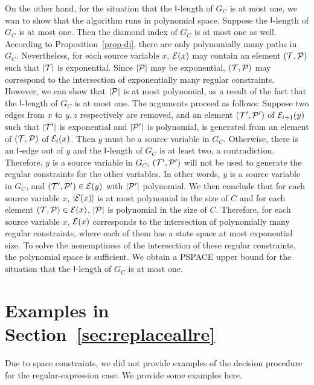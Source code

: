 On the other hand, for the situation that the $\mathsf{l}$-length of $G_C$ is at most one, we wan to show that the algorithm runs in polynomial space. Suppose the $\mathsf{l}$-length of $G_C$ is at most one. Then the diamond index of $G_C$ is at most one as well. According to Proposition~\ref{prop-di}, there are only polynomially many paths in $G_C$. Nevertheless, for each source variable $x$, $\mathcal{E}(x)$ may contain an element $(\mathcal{T},\mathcal{P})$ such that $|\mathcal{T}|$ is exponential. Since $|\mathcal{P}|$ may be exponential, $(\mathcal{T},\mathcal{P})$ may correspond to the intersection of exponentially many regular constraints. However, we can show that $|\mathcal{P}|$ is at most polynomial, as a result of the fact that the $\mathsf{l}$-length of $G_C$ is at most one. The arguments proceed as follows: Suppose two edges from $x$ to $y, z$ respectively are removed, and an element $(\mathcal{T}', \mathcal{P}')$ of $\mathcal{E}_{i+1}(y)$ such that $|\mathcal{T}'|$ is exponential and $|\mathcal{P}'|$ is polynomial, is generated from an element of $(\mathcal{T}, \mathcal{P})$ of $\mathcal{E}_i(x)$. Then $y$ must be a source variable in $G_C$. Otherwise, there is an $\mathsf{l}$-edge out of $y$ and the $\mathsf{l}$-length of $G_C$ is at least two, a contradiction. Therefore, $y$ is a source variable in $G_C$, $(\mathcal{T}', \mathcal{P}')$  will not be used to generate the regular constraints for the other variables. In other words, $y$ is a source variable in $G_C$, and $(\mathcal{T}', \mathcal{P}') \in \mathcal{E}(y)$ with $|\mathcal{P}'|$ polynomial. We then conclude that for each source variable $x$, $|\mathcal{E}(x)|$  is at most polynomial in the size of $C$ and for each element $(\mathcal{T}, \mathcal{P}) \in \mathcal{E}(x)$, $|\mathcal{P}|$ is polynomial in the size of $C$. Therefore, for each source variable $x$,  $\mathcal{E}(x)$ corresponds to the intersection of polynomially many regular constraints, where each of them has a state space at most exponential size. To solve the nonemptiness of the intersection of these regular constraints, the polynomial space is sufficient. We obtain a PSPACE upper bound for the situation that the $\mathsf{l}$-length of $G_C$ is at most one.


\def\refsecreplaceallre{\ref{sec:replaceallre}}
\section{Examples in Section~\protect\refsecreplaceallre}

Due to space constraints, we did not provide examples of the decision procedure for the regular-expression case.
We provide some examples here.


